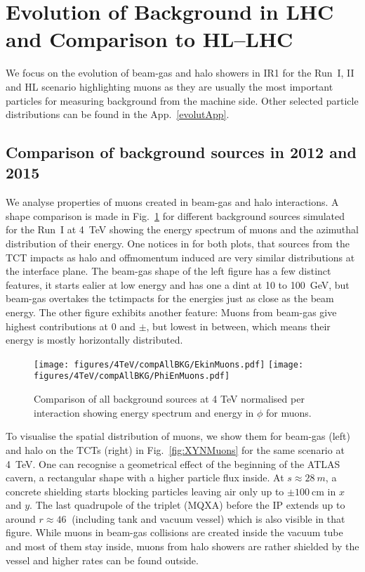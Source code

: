\newpage
\section{Evolution of Background in LHC and Comparison to HL--LHC\label{evolut}}

We focus on the evolution of beam-gas and halo showers in IR1 for the Run~I, II and HL scenario highlighting muons as they are usually the most important particles for measuring background from the machine side. Other selected particle distributions can be found in the App.~\ref{evolutApp}.

\subsection{Comparison of background sources in 2012 and 2015}


We analyse properties of muons created in beam-gas and halo interactions. A shape comparison is made in Fig.~\ref{fig:compAllBKG_muons} for different background sources simulated for the Run~I at 4~TeV showing the energy spectrum of muons and the azimuthal distribution of their energy. One notices in for both plots, that sources from the TCT impacts as halo and offmomentum induced are very similar distributions at the interface plane. The beam-gas shape of the left figure has a few distinct features, it starts ealier at low energy and has one a dint at 10 to 100~GeV, but beam-gas overtakes the tctimpacts for the energies just as close as the beam energy. The other figure exhibits another feature: Muons from beam-gas give highest contributions at $0$ and $\pm$, but lowest in between, which means their energy is mostly horizontally distributed.\\

\begin{figure}%
\begin{center}
  \texttt{[image: figures/4TeV/compAllBKG/EkinMuons.pdf]}
  \texttt{[image: figures/4TeV/compAllBKG/PhiEnMuons.pdf]}
\end{center}
\vspace{-0.6cm}
 \caption{Comparison of all background sources at 4 TeV normalised per interaction showing energy spectrum and energy in $\phi$ for muons.
  \label{fig:compAllBKG_muons}}
\end{figure}
To visualise the spatial distribution of muons, we show them for beam-gas (left) and halo on the TCTs (right) in Fig.~\ref{fig:XYNMuons} for the same scenario at 4~TeV. One can recognise a geometrical effect of the beginning of the ATLAS cavern, a rectangular shape with a higher particle flux inside. At $s \approx 28~m$, a concrete shielding starts blocking particles leaving air only up to $\pm 100~$cm in $x$ and $y$. The last quadrupole of the triplet (MQXA) before the IP extends up to around $r \approx 46~$ (including tank and vacuum vessel) which is also visible in that figure. While muons in beam-gas collisions are created inside the vacuum tube and most of them stay inside, muons from halo showers are rather shielded by the vessel and higher rates can be found outside.


